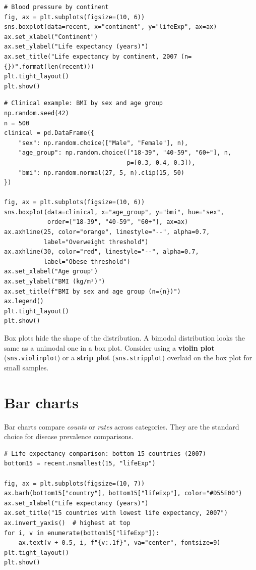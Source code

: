 \begin{verbatim}
# Blood pressure by continent
fig, ax = plt.subplots(figsize=(10, 6))
sns.boxplot(data=recent, x="continent", y="lifeExp", ax=ax)
ax.set_xlabel("Continent")
ax.set_ylabel("Life expectancy (years)")
ax.set_title("Life expectancy by continent, 2007 (n={})".format(len(recent)))
plt.tight_layout()
plt.show()
\end{verbatim}

\begin{verbatim}
# Clinical example: BMI by sex and age group
np.random.seed(42)
n = 500
clinical = pd.DataFrame({
    "sex": np.random.choice(["Male", "Female"], n),
    "age_group": np.random.choice(["18-39", "40-59", "60+"], n,
                                  p=[0.3, 0.4, 0.3]),
    "bmi": np.random.normal(27, 5, n).clip(15, 50)
})

fig, ax = plt.subplots(figsize=(10, 6))
sns.boxplot(data=clinical, x="age_group", y="bmi", hue="sex",
            order=["18-39", "40-59", "60+"], ax=ax)
ax.axhline(25, color="orange", linestyle="--", alpha=0.7,
           label="Overweight threshold")
ax.axhline(30, color="red", linestyle="--", alpha=0.7,
           label="Obese threshold")
ax.set_xlabel("Age group")
ax.set_ylabel("BMI (kg/m²)")
ax.set_title(f"BMI by sex and age group (n={n})")
ax.legend()
plt.tight_layout()
plt.show()
\end{verbatim}

\begin{warningbox}
Box plots hide the shape of the distribution. A bimodal distribution looks the same as a unimodal one in a box plot. Consider using a \textbf{violin plot} (\texttt{sns.violinplot}) or a \textbf{strip plot} (\texttt{sns.stripplot}) overlaid on the box plot for small samples.
\end{warningbox}

\section{Bar charts}

Bar charts compare \emph{counts} or \emph{rates} across categories. They are the standard choice for disease prevalence comparisons.

\begin{verbatim}
# Life expectancy comparison: bottom 15 countries (2007)
bottom15 = recent.nsmallest(15, "lifeExp")

fig, ax = plt.subplots(figsize=(10, 7))
ax.barh(bottom15["country"], bottom15["lifeExp"], color="#D55E00")
ax.set_xlabel("Life expectancy (years)")
ax.set_title("15 countries with lowest life expectancy, 2007")
ax.invert_yaxis()  # highest at top
for i, v in enumerate(bottom15["lifeExp"]):
    ax.text(v + 0.5, i, f"{v:.1f}", va="center", fontsize=9)
plt.tight_layout()
plt.show()
\end{verbatim}

